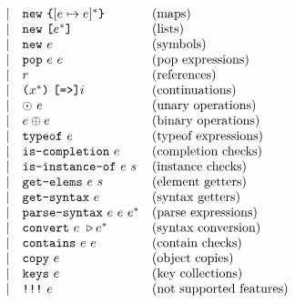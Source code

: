 \[\begin{array}{lrclrll}
    &&&&\mid& \C{new}\ \C{\{} [\expr \mapsto \expr]^* \C{\}}    & \text{(maps)}\\
    &&&&\mid& \C{new}\ \C{[} \expr^* \C{]}                      & \text{(lists)}\\
    &&&&\mid& \C{new}\ \expr                                    & \text{(symbols)}\\
    &&&&\mid& \C{pop}\ \expr\ \expr                             & \text{(pop expressions)}\\
    &&&&\mid& \refvalue                                         & \text{(references)}\\
    &&&&\mid& \C{(} \id^* \C{)}\ \C{[=>]} \inst                 & \text{(continuations)}\\
    &&&&\mid& \uop\ \expr                                       & \text{(unary operations)}\\
    &&&&\mid& \expr \bop \expr                                  & \text{(binary operations)}\\
    &&&&\mid& \C{typeof}\ \expr                                 & \text{(typeof expressions)}\\
    &&&&\mid& \C{is-completion}\ \expr                          & \text{(completion checks)}\\
    &&&&\mid& \C{is-instance-of}\ \expr\ \str                   & \text{(instance checks)}\\
    &&&&\mid& \C{get-elems}\ \expr\ \str                        & \text{(element getters)}\\
    &&&&\mid& \C{get-syntax}\ \expr                             & \text{(syntax getters)}\\
    &&&&\mid& \C{parse-syntax}\ \expr\ \expr\ \expr^*           & \text{(parse expressions)}\\
    &&&&\mid& \C{convert}\ \expr\ \cop \expr^*                  & \text{(syntax conversion)}\\
    &&&&\mid& \C{contains}\ \expr\ \expr                        & \text{(contain checks)}\\
    &&&&\mid& \C{copy}\ \expr                                   & \text{(object copies)}\\
    &&&&\mid& \C{keys}\ \expr                                   & \text{(key collections)}\\
    &&&&\mid& \C{!!!}\ \expr                                    & \text{(not supported features)}\\
  \end{array}
\]

